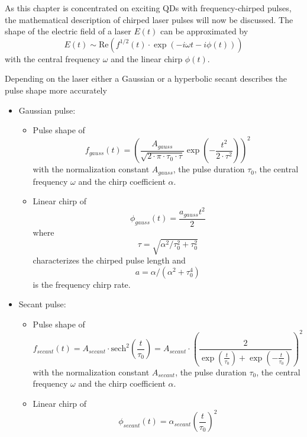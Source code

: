 As this chapter is concentrated on exciting \acp{QD} with frequency-chirped pulses, the mathematical description of chirped laser pulses will now be discussed. The shape of the electric field of a laser $E(t)$ can be approximated by
\begin{equation}
\label{eq:electric-field-laser}
E(t) \sim \mathrm{Re}\left(f^{1/2}(t) \cdot \exp\left(-i \omega t - i \phi(t)\right)\right)
\end{equation}
with the central frequency $\omega$ and the linear chirp $\phi(t)$.

Depending on the laser either a Gaussian or a hyperbolic secant describes the pulse shape more accurately~\cite{glassl_biexciton_2013, hirayama_real-time_2002}

\begin{itemize}
	\item Gaussian pulse:
	\begin{itemize}
		\item Pulse shape of
		\begin{equation}
		\label{eq:f_gauss}
		f_{gauss}(t) = \left(\frac{A_{gauss}}{\sqrt{2 \cdot \pi \cdot \tau_0 \cdot \tau}} \exp\left(-\frac{t^2}{2 \cdot \tau^2}\right)\right)^2
		\end{equation}
		with the normalization constant $A_{gauss}$, the pulse duration $\tau_0$, the central frequency $\omega$ and the chirp coefficient $\alpha$.
		\item Linear chirp of
		\begin{equation}
		\label{eq:phi-gauss}
		\phi_{gauss}(t) = \frac{a_{gauss} t^2}{2}
		\end{equation}
		where 
		\begin{equation}
		\tau = \sqrt{\alpha^2 / \tau_0^2 + \tau_0^2}
		\end{equation}
		characterizes the chirped pulse length and
		\begin{equation}
		\label{eq:chirp-parameter}
		a = \alpha / (\alpha ^ 2 + \tau _0 ^ 4)
		\end{equation}
		is the frequency chirp rate.
	\end{itemize}
	\newpage
	\item Secant pulse:
	\begin{itemize}
		\item Pulse shape of
		\begin{equation}
		f_{secant}(t) = A_{secant} \cdot \textrm{sech}^2\left(\frac{t}{\tau_0}\right) = A_{secant} \cdot \left(\frac{2}{\exp(\frac{t}{\tau_0}) + \exp(-\frac{t}{\tau_0})}\right)^2
		\end{equation}
		with the normalization constant $A_{secant}$, the pulse duration $\tau_0$, the central frequency $\omega$ and the chirp coefficient $\alpha$.
		\item Linear chirp of
		\begin{equation}
		\phi_{secant}(t) = \alpha_{secant}\left(\frac{t}{\tau_0}\right)^2
		\end{equation}
	\end{itemize}
\end{itemize}


